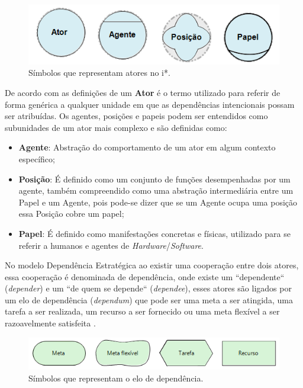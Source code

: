 \begin{figure}[h!]
	\centering
	\includegraphics[keepaspectratio=true,scale=1.0]{figuras/papeisIstar.PNG}
	\caption{Símbolos que representam atores no i*.}
	\label{atoresIstar}
\end{figure}

De acordo com as definições de \cite{istarwiki20} um  \textbf{Ator} é o termo utilizado para referir de forma genérica a qualquer unidade em que as dependências intencionais possam ser atribuídas. Os agentes, posições e papeis podem ser entendidos como subunidades de um ator mais complexo e são definidas como: 

\begin{itemize}
	\item \textbf{Agente}: Abstração do comportamento de um ator em algum contexto específico; 
	\item \textbf{Posição}: É definido como um conjunto de funções desempenhadas por um agente, também compreendido como uma abstração intermediária entre um Papel e um Agente, pois pode-se dizer que se um Agente ocupa uma posição essa Posição cobre um papel;
	\item \textbf{Papel}: É definido como manifestações concretas e físicas, utilizado para se referir a humanos e agentes de \textit{Hardware}/\textit{Software}.
\end{itemize} 

No modelo Dependência Estratégica ao existir uma cooperação entre dois atores, essa cooperação é denominada de dependência, onde existe um ``dependente`` (\textit{depender}) e um ``de quem se depende`` (\textit{dependee}), esses atores são ligados por um elo de dependência (\textit{dependum}) que pode ser uma meta a ser atingida, uma tarefa a ser realizada, um recurso a ser fornecido ou uma meta flexível a ser razoavelmente satisfeita \cite{napolitano2009estrategia}. 

\begin{figure}[h!]
	\centering
	\includegraphics[keepaspectratio=true,scale=1.0]{figuras/TiposDeContribuicao.png}
	\caption{Símbolos que representam o elo de dependência.}
	\label{dependenciaIstar}
\end{figure} 

